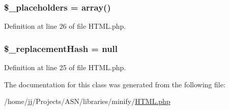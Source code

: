 \subsubsection[{\texorpdfstring{\$\+\_\+placeholders}{$_placeholders}}]{\setlength{\rightskip}{0pt plus 5cm}\$\+\_\+placeholders = array()\hspace{0.3cm}{\ttfamily [protected]}}\hypertarget{class_minify___h_t_m_l_a3d9bdc0b92480ec4d920984f225b69cb}{}\label{class_minify___h_t_m_l_a3d9bdc0b92480ec4d920984f225b69cb}


Definition at line 26 of file H\+T\+M\+L.\+php.

\subsubsection[{\texorpdfstring{\$\+\_\+replacement\+Hash}{$_replacementHash}}]{\setlength{\rightskip}{0pt plus 5cm}\$\+\_\+replacement\+Hash = null\hspace{0.3cm}{\ttfamily [protected]}}\hypertarget{class_minify___h_t_m_l_a6fd24402e7ef89f7a53d3f28caa0e99d}{}\label{class_minify___h_t_m_l_a6fd24402e7ef89f7a53d3f28caa0e99d}


Definition at line 25 of file H\+T\+M\+L.\+php.



The documentation for this class was generated from the following file\+:\begin{DoxyCompactItemize}
\item 
/home/jj/\+Projects/\+A\+S\+N/libraries/minify/\hyperlink{_h_t_m_l_8php}{H\+T\+M\+L.\+php}\end{DoxyCompactItemize}
